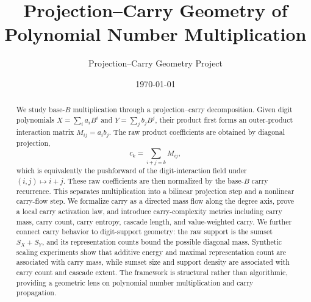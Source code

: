 \documentclass[11pt]{article}
\title{Projection--Carry Geometry of Polynomial Number Multiplication}
\author{Projection--Carry Geometry Project}
\date{\today}
\begin{document}
\maketitle

\begin{abstract}
We study base-\(B\) multiplication through a projection--carry decomposition.
Given digit polynomials \(X=\sum_i a_i B^i\) and \(Y=\sum_j b_j B^j\), their
product first forms an outer-product interaction matrix \(M_{ij}=a_i b_j\).
The raw product coefficients are obtained by diagonal projection,
\[
c_k=\sum_{i+j=k}M_{ij},
\]
which is equivalently the pushforward of the digit-interaction field under
\((i,j)\mapsto i+j\). These raw coefficients are then normalized by the
base-\(B\) carry recurrence. This separates multiplication into a bilinear
projection step and a nonlinear carry-flow step. We formalize carry as a
directed mass flow along the degree axis, prove a local carry activation law,
and introduce carry-complexity metrics including carry mass, carry count,
carry entropy, cascade length, and value-weighted carry. We further connect
carry behavior to digit-support geometry: the raw support is the sumset
\(S_X+S_Y\), and its representation counts bound the possible diagonal mass.
Synthetic scaling experiments show that additive energy and maximal
representation count are associated with carry mass, while sumset size and
support density are associated with carry count and cascade extent. The
framework is structural rather than algorithmic, providing a geometric lens on
polynomial number multiplication and carry propagation.
\end{abstract}










\nocite{*}


\end{document}
